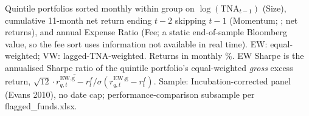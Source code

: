 \begin{singlespace}\footnotesize\noindent
Quintile portfolios sorted monthly within group on $\log(\text{TNA}_{t-1})$ (Size), cumulative 11-month net return ending $t-2$ skipping $t-1$ (Momentum; \citealt{JegadeeshTitman1993}; net returns), and annual Expense Ratio (Fee; a static end-of-sample Bloomberg value, so the fee sort uses information not available in real time). EW: equal-weighted; VW: lagged-TNA-weighted. Returns in monthly \%. EW Sharpe is the annualised Sharpe ratio of the quintile portfolio's equal-weighted \textit{gross} excess return, $\sqrt{12}\cdot\overline{r^{\text{EW,g}}_{q,t}-r^{f}_{t}}/\sigma(r^{\text{EW,g}}_{q,t}-r^{f}_{t})$. Sample: Incubation-corrected panel (Evans 2010), no date cap; performance-comparison subsample per flagged\_funds.xlsx.
\end{singlespace}\par\vspace{24pt}


